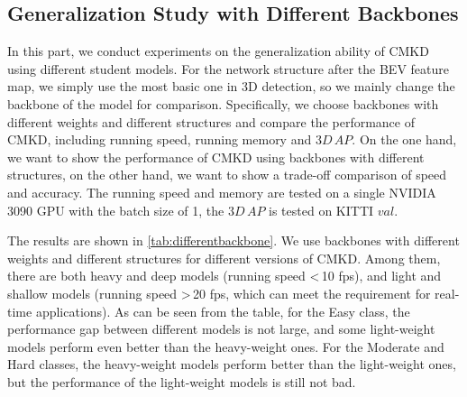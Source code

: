 \documentclass[runningheads]{llncs}
\begin{document}
\subsection{Generalization Study with Different Backbones}

In this part, we conduct experiments on the generalization ability of CMKD using different student models.
For the network structure after the BEV feature map, we simply use the most basic one in 3D detection, so we mainly change the backbone of the model for comparison.
Specifically, we choose backbones with different weights and different structures and compare the performance of CMKD, including running speed, running memory and $3D\,AP$.
On the one hand, we want to show the performance of CMKD using backbones with different structures, 
on the other hand, we want to show a trade-off comparison of speed and accuracy.
The running speed and memory are tested on a single NVIDIA 3090 GPU with the batch size of 1, the $3D\,AP$ is tested on KITTI $val$.

The results are shown in \cref{tab:differentbackbone}.
We use backbones with different weights and different structures for different versions of CMKD. 
Among them, there are both heavy and deep models (running speed \textless \,10 fps), and light and shallow models (running speed \textgreater \,20 fps, which can meet the requirement for real-time applications). 
As can be seen from the table, for the Easy class, the performance gap between different models is not large, and some light-weight models perform even better than the heavy-weight ones.
For the Moderate and Hard classes, the heavy-weight models perform better than the light-weight ones, but the performance of the light-weight models is still not bad.
\end{document}
